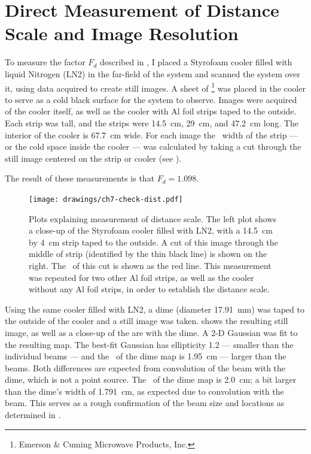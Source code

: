 \section{Direct Measurement of Distance Scale and Image Resolution} \label{sec:ch7-dist-scale}

To measure the factor $F_d$ described in , I placed a Styrofoam cooler filled with liquid Nitrogen (LN2) in the far-field of the system and scanned the system over it, using data acquired to create still images.
A sheet of \ecco\footnote{Emerson \& Cuming Microwave Products, Inc.} was placed in the cooler to serve as a cold black surface for the system to observe.
Images were acquired of the cooler itself, as well as the cooler with Al foil strips taped to the outside.
Each strip was  tall, and the strips were \SI{14.5}{\cm}, \SI{29}{\cm}, and \SI{47.2}{\cm} long.
The interior of the cooler is \SI{67.7}{\cm} wide.
For each image the \FWHM\ width of the strip --- or the cold space inside the cooler --- was calculated by taking a cut through the still image centered on the strip or cooler (see ).

The result of these measurements is that $F_d = 1.098$.

\begin{figure}
\centering
\texttt{[image: drawings/ch7-check-dist.pdf]}
\caption[Distance scale measurements]{
  Plots explaining measurement of distance scale.
  The left plot shows a close-up of the Styrofoam cooler filled with LN2, with a \SI{14.5}{\cm} by \SI{4}{\cm} strip taped to the outside.
  A cut of this image through the middle of strip (identified by the thin black line) is shown on the right.
  The \FWHM\ of this cut is shown as the red line.
  This measurement was repeated for two other Al foil strips, as well as the cooler without any Al foil strips, in order to establish the distance scale.
}
\label{fig:ch7-check-dist}
\end{figure}


Using the same cooler filled with LN2, a dime (diameter \SI{17.91}{\mm}) was taped to the outside of the cooler and a still image was taken.
 shows the resulting still image, as well as a close-up of the are with the dime.
A 2-D Gaussian was fit to the resulting map.
The best-fit Gaussian has ellipticity 1.2 --- smaller than the individual beams --- and the \FWHM\ of the dime map is \SI{1.95}{\cm} --- larger than the beams.
Both differences are expected from convolution of the beam with the dime, which is not a point source.
The \FWHM\ of the dime map is \SI{2.0}{\cm}; a bit larger than the dime's width of \SI{1.791}{\cm}, as expected due to convolution with the beam.
This serves as a rough confirmation of the beam size and locations as determined in .

